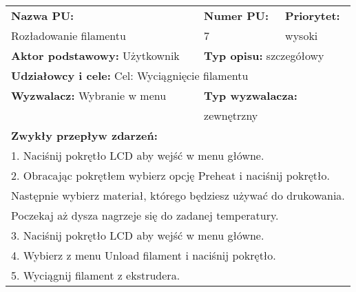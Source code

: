 \documentclass{article}
\begin{document}
\begin{enumerate}[label=\arabic*.]
\newpage
\begin{tabular}{|p{5cm}|p{3cm}|p{3cm}|p{3cm}|p{}|p{3cm}|}
\hline
\multicolumn{4}{|l|}{\textbf{Nazwa PU:}} & \multicolumn{1}{l|}{\textbf{Numer PU:}} & \multicolumn{1}{|l|}{\textbf{Priorytet:} } \\ 
\multicolumn{4}{|l|}{Rozładowanie filamentu} & \multicolumn{1}{l|}{7} & \multicolumn{1}{|l|}{wysoki}\\ \hline
\multicolumn{3}{|l|}{\textbf{Aktor podstawowy:} Użytkownik} & \multicolumn{3}{l|}{\textbf{Typ opisu:} szczegółowy} \\ \hline
\multicolumn{6}{|l|}{\textbf{Udziałowcy i cele:} Cel: Wyciągnięcie filamentu} \\ \hline
\multicolumn{3}{|l|}{\textbf{Wyzwalacz:} Wybranie w menu} & \multicolumn{3}{l|}{\textbf{Typ wyzwalacza:}} \\ 
\multicolumn{3}{|l|}{} & \multicolumn{3}{l|}{zewnętrzny} \\
\hline
\multicolumn{6}{|l|}{\textbf{Zwykły przepływ zdarzeń:}} \\
\multicolumn{6}{|l|}{1. Naciśnij pokrętło LCD aby wejść w menu główne.} \\
\multicolumn{6}{|l|}{2. Obracając pokrętłem wybierz opcję Preheat i naciśnij pokrętło.} \\
\multicolumn{6}{|l|}{Następnie wybierz materiał, którego będziesz używać do drukowania.} \\
\multicolumn{6}{|l|}{Poczekaj aż dysza nagrzeje się do zadanej temperatury.} \\
\multicolumn{6}{|l|}{3. Naciśnij pokrętło LCD aby wejść w menu główne.} \\
\multicolumn{6}{|l|}{4. Wybierz z menu Unload filament i naciśnij pokrętło.} \\
\multicolumn{6}{|l|}{5. Wyciągnij filament z ekstrudera.} \\
\hline

\end{tabular}


\end{enumerate}
\end{document}
